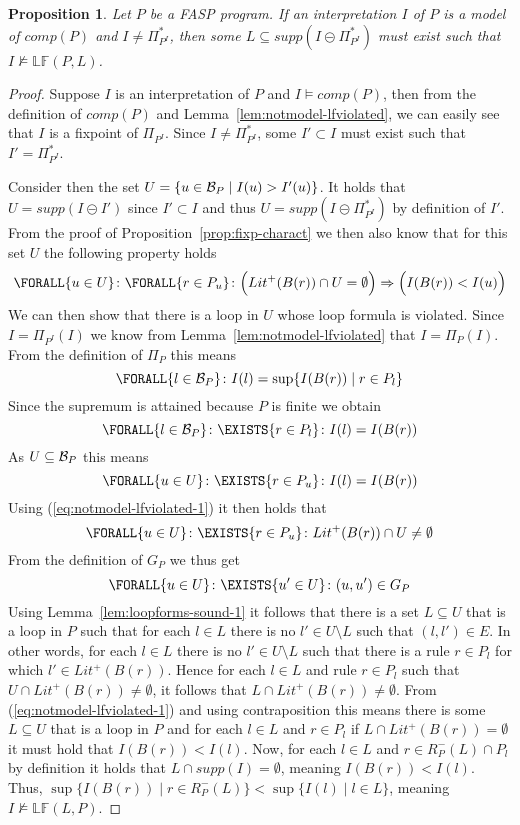 \documentclass{tlp}
\newcommand{\hbase}[1]{{\ensuremath{{\cal B}_{#1}}}}
\newcommand{\body}[1]{\ensuremath{B(#1)}}
\newcommand{\comp}[1]{\ensuremath{comp(#1)}}
\newcommand{\poslit}[1]{\ensuremath{Lit^{+}(#1)}}
\newcommand{\posbody}[1]{\ensuremath{\poslit{\body{#1}}}}
\newcommand{\nonlooprules}[2]{R^{-}_{#1}(#2)}
\newcommand{\loopform}[2]{\mathbb{LF}(#1,#2)}
\newcommand{\supp}[1]{\ensuremath{\mathit{supp}(#1)}}
\newcommand{\fsetminus}{\circleddash}
\newcommand{\nfimcons}[1]{\Pi_{#1}}
\newcommand{\lfpnfimcons}[1]{\nfimcons{#1}^{*}}
\newcommand{\SUCHTHAT}{\colon}
\newcommand{\Exists}[2]{\ensuremath{\EXISTS{#1} \SUCHTHAT {#2}}}
\newcommand{\Forall}[2]{\ensuremath{\FORALL{#1} \SUCHTHAT {#2}}}
\newtheorem{proposition}{Proposition}
\newcommand{\imp}{\Rightarrow}
\begin{document}
\begin{proposition}\label{prop:notmodel-lfviolated}
 Let $P$ be a FASP program. If an interpretation $I$ of $P$ is a model of $\comp{P}$ and $I \neq \lfpnfimcons{P^I}$, then some $L \subseteq \supp{I \fsetminus \lfpnfimcons{P^I}}$ must exist such that $I \not\models \loopform{P}{L}$.
\end{proposition}
\begin{proof}
 Suppose $I$ is an interpretation of $P$ and $I \models \comp{P}$, then from the definition of $\comp{P}$ and Lemma~\ref{lem:notmodel-lfviolated}, we can easily see that $I$ is a fixpoint of $\nfimcons{P^I}$. Since $I \neq \lfpnfimcons{P^I}$, some $I' \subset I$ must exist such that $I' = \lfpnfimcons{P^I}$.
 
 Consider then the set $U = \{ u \in \hbase{P} \mid I(u) > I'(u) \}$. It holds that $U = \supp{I \fsetminus I'}$ since $I' \subset I$ and thus $U = \supp{I \fsetminus \lfpnfimcons{P^I}}$ by definition of $I'$. From the proof of Proposition~\ref{prop:fixp-charact} we then also know that for this set $U$ the following property holds
  \begin{equation}\Forall{u \in U}{\Forall{r \in P_u}{\Big(\posbody{r} \cap U = \emptyset\Big) \imp \Big(I(\body{r}) < I(u)\Big)}}\label{eq:notmodel-lfviolated-1}\end{equation}
 We can then show that there is a loop in $U$ whose loop formula is violated. Since $I = \nfimcons{P^{I}}(I)$ we know from Lemma~\ref{lem:notmodel-lfviolated} that $I = \nfimcons{P}(I)$. From the definition of $\nfimcons{P}$ this means
  $$\Forall{l \in \hbase{P}}{I(l) = \sup \{I(\body{r}) \mid r \in P_l \}}$$
 Since the supremum is attained because $P$ is finite we obtain
  $$\Forall{l \in \hbase{P}}{\Exists{r \in P_l}{I(l) = I(\body{r})}}$$
 As $U \subseteq \hbase{P}$ this means
  $$ \Forall{u \in U}{\Exists{r \in P_u}{I(l) = I(\body{r})}}$$
 Using (\ref{eq:notmodel-lfviolated-1}) it then holds that
   $$\Forall{u \in U}{\Exists{r \in P_u}{\posbody{r} \cap U \neq \emptyset}}$$
  From the definition of $G_{P}$ we thus get
   $$\Forall{u \in U}{\Exists{u' \in U}{(u,u') \in G_{P}}}$$
  Using Lemma~\ref{lem:loopforms-sound-1} it follows that there is a set $L \subseteq U$ that is a loop in $P$ such that for each $l \in L$ there is no $l' \in U\setminus L$ such that $(l,l') \in E$. In other words, for each $l \in L$ there is no $l' \in U\setminus L$ such that there is a rule $r \in P_l$ for which $l' \in \posbody{r}$. Hence for each $l \in L$ and rule $r \in P_l$ such that $U \cap \posbody{r} \neq \emptyset$, it follows that $L \cap \posbody{r} \neq \emptyset$.
  From (\ref{eq:notmodel-lfviolated-1}) and using contraposition this means there is some $L \subseteq U$ that is a loop in $P$ and for each $l \in L$ and $r \in P_{l}$ if $L \cap \posbody{r} = \emptyset$ it must hold that $I(\body{r}) < I(l)$.
  Now, for each $l \in L$ and $r \in \nonlooprules{P}{L} \cap P_l$ by definition it holds that $L \cap \supp{I} = \emptyset$, meaning $I(\body{r}) < I(l)$. Thus, $\sup \{ I(\body{r}) \mid r \in \nonlooprules{P}{L} \} < \sup \{ I(l) \mid l \in L \}$, meaning $I \not\models \loopform{L}{P}$.
\end{proof}
\end{document}
